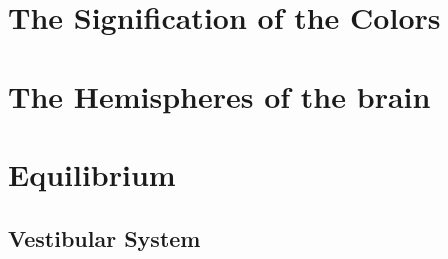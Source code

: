 \documentclass[../main.tex]{subfiles}
\begin{document}




\chapter{The Signification of the Colors}



\chapter{The Hemispheres of the brain}



\chapter{Equilibrium}



\section{Vestibular System}


\end{document}
